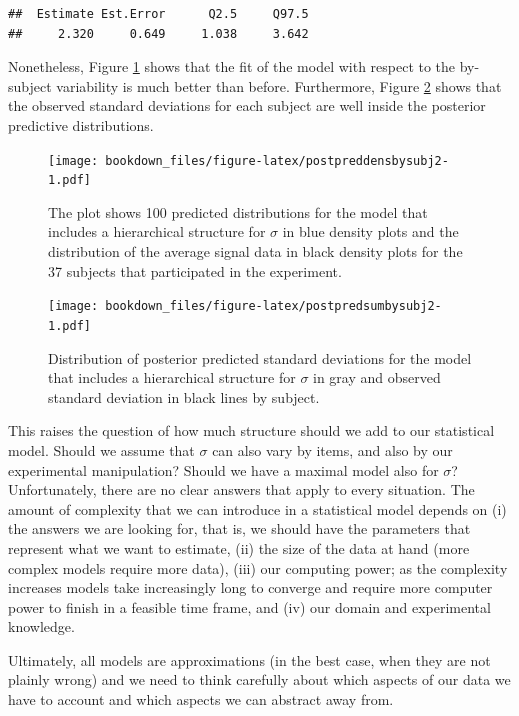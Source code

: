 \documentclass[12pt,]{krantz}
\theoremstyle{definition}
\theoremstyle{definition}
\theoremstyle{definition}
\theoremstyle{remark}
\begin{document}
\begin{verbatim}
##  Estimate Est.Error      Q2.5     Q97.5 
##     2.320     0.649     1.038     3.642
\end{verbatim}

Nonetheless, Figure \ref{fig:postpreddensbysubj2} shows that the fit of the model with respect to the by-subject variability is much better than before. Furthermore, Figure \ref{fig:postpredsumbysubj2} shows that the observed standard deviations for each subject are well inside the posterior predictive distributions.



\begin{figure}
\centering
\texttt{[image: bookdown\_files/figure-latex/postpreddensbysubj2-1.pdf]}
\caption{\label{fig:postpreddensbysubj2}The plot shows 100 predicted distributions for the model that includes a hierarchical structure for \(\sigma\) in blue density plots and the distribution of the average signal data in black density plots for the 37 subjects that participated in the experiment.}
\end{figure}



\begin{figure}
\centering
\texttt{[image: bookdown\_files/figure-latex/postpredsumbysubj2-1.pdf]}
\caption{\label{fig:postpredsumbysubj2}Distribution of posterior predicted standard deviations for the model that includes a hierarchical structure for \(\sigma\) in gray and observed standard deviation in black lines by subject.}
\end{figure}

This raises the question of how much structure should we add to our statistical model. Should we assume that \(\sigma\) can also vary by items, and also by our experimental manipulation? Should we have a maximal model also for \(\sigma\)? Unfortunately, there are no clear answers that apply to every situation. The amount of complexity that we can introduce in a statistical model depends on (i) the answers we are looking for, that is, we should have the parameters that represent what we want to estimate, (ii) the size of the data at hand (more complex models require more data), (iii) our computing power; as the complexity increases models take increasingly long to converge and require more computer power to finish in a feasible time frame, and (iv) our domain and experimental knowledge.

Ultimately, all models are approximations (in the best case, when they are not plainly wrong) and we need to think carefully about which aspects of our data we have to account and which aspects we can abstract away from.
\end{document}
